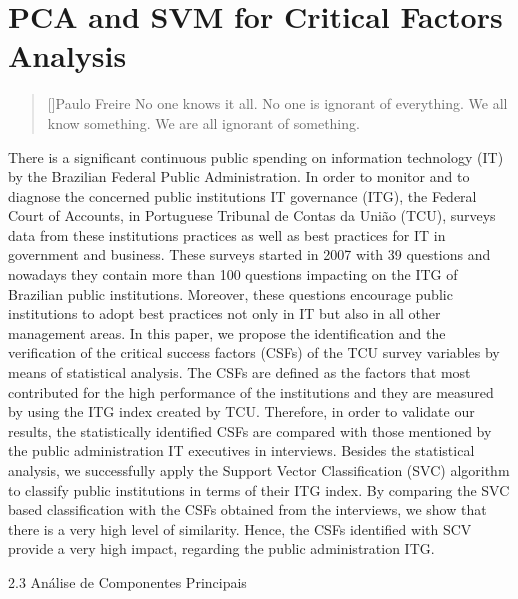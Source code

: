 \chapter{PCA and SVM for Critical Factors Analysis}
\label{ch:2_pca_svm_cfa}

\begin{quotation}[]{Paulo Freire}
No one knows it all. No one is ignorant of everything. We all know something. We are all ignorant of something.
\end{quotation}

There is a significant continuous public spending on information technology (IT) by the Brazilian Federal Public Administration. In order to monitor and to diagnose the concerned public institutions IT governance (ITG), the Federal Court of Accounts, in Portuguese Tribunal de Contas da União (TCU), surveys data from these institutions practices as well as best practices for IT in government and business. These surveys started in 2007 with 39 questions and nowadays they contain more than 100 questions impacting on the ITG of Brazilian public institutions. Moreover, these questions encourage public institutions to adopt best practices not only in IT but also in all other management areas. In this paper, we propose the identification and the verification of the critical success factors (CSFs) of the TCU survey variables by means of statistical analysis. The CSFs are defined as the factors that most contributed for the high performance of the institutions and they are measured by using the ITG index created by TCU. Therefore, in order to validate our results, the statistically identified CSFs are compared with those mentioned by the public administration IT executives in interviews. Besides the statistical analysis, we successfully apply the Support Vector Classification (SVC) algorithm to classify public institutions in terms of their ITG index. By comparing the SVC based classification with the CSFs obtained from the interviews, we show that there is a very high level of similarity. Hence, the CSFs identified with SCV provide a very high impact, regarding the public administration ITG.

2.3 Análise de Componentes Principais

